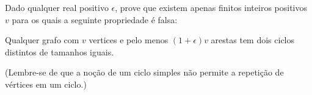 Dado qualquer real positivo $\epsilon$, prove que existem apenas finitos inteiros positivos $v$ para os quais a seguinte propriedade é falsa:

Qualquer grafo com $v$ vertices e pelo menos $(1+\epsilon)v$ arestas tem dois ciclos distintos de tamanhos iguais.

(Lembre-se de que a noção de um ciclo simples não permite a repetição de vértices em um ciclo.)